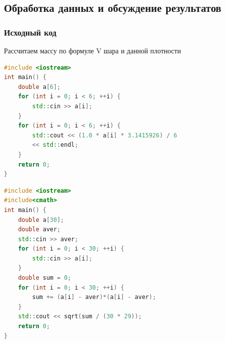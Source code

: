 \documentclass[14pt,a4paper]{extarticle}
\begin{document}
\subsection{Обработка данных и обсуждение результатов}
\subsubsection*{Исходный код}
Рассчитаем массу по формуле V шара и данной плотности 
\begin{lstlisting}[language=C++]
#include <iostream>
int main() {
	double a[6];
	for (int i = 0; i < 6; ++i) {
		std::cin >> a[i];
	}
	for (int i = 0; i < 6; ++i) {
		std::cout << (1.0 * a[i] * 3.1415926) / 6 
        << std::endl;
	}
	return 0;
}
\end{lstlisting}
\begin{lstlisting}[language=C++]
#include <iostream>
#include<cmath>
int main() {
	double a[30];
	double aver;
	std::cin >> aver;
	for (int i = 0; i < 30; ++i) {
		std::cin >> a[i];
	}
	double sum = 0;
	for (int i = 0; i < 30; ++i) {
		sum += (a[i] - aver)*(a[i] - aver);
	}
	std::cout << sqrt(sum / (30 * 29));
	return 0;
}
\end{lstlisting}
\newpage
\end{document}
